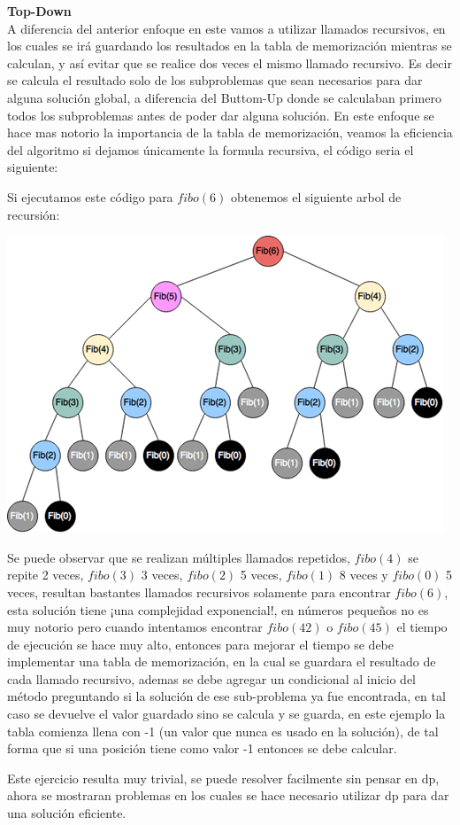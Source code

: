\documentclass[12pt, a4paper]{article}
\newcommand\cppfile[2][]{

}
\begin{document}
	\textbf{Top-Down}\\
	A diferencia del anterior enfoque en este vamos a utilizar llamados recursivos, en los cuales se irá guardando
	los resultados en la tabla de memorización mientras se calculan, y así evitar que se realice dos veces el
	mismo llamado recursivo. Es decir se calcula el resultado solo de los subproblemas que sean necesarios para 
	dar alguna solución global, a diferencia del Buttom-Up donde se calculaban primero todos los
	subproblemas antes de poder dar alguna solución. En este enfoque se hace mas notorio la importancia de la tabla 
	de memorización, veamos la eficiencia del algoritmo si dejamos únicamente la formula recursiva, el código seria 
	el siguiente:
	\cppfile[14-20]{codigos/fibo.cpp}
	Si ejecutamos este código para $fibo(6)$ obtenemos el siguiente arbol de recursión:\\
	\begin{center}
		\includegraphics[scale=0.92]{imagenes/arbol_recursion}
	\end{center}
	
	Se puede observar que se realizan múltiples llamados repetidos, $fibo(4)$ se repite 2 veces, $fibo(3)$
	3 veces, $fibo(2)$ 5 veces, $fibo(1)$ 8 veces y $fibo(0)$ 5 veces, resultan bastantes llamados recursivos
	solamente para encontrar $fibo(6)$, esta solución tiene ¡una complejidad exponencial!, en números pequeños
	no es muy notorio pero cuando intentamos encontrar $fibo(42)$ o $fibo(45)$ el tiempo de ejecución se hace
	muy alto, entonces para mejorar el tiempo se debe implementar una tabla de memorización, en la cual se guardara
	el resultado de cada llamado recursivo, ademas se debe agregar un condicional al inicio del método preguntando
	si la solución de ese sub-problema ya fue encontrada, en tal caso se devuelve el valor guardado sino se calcula
	y se guarda, en este ejemplo la tabla comienza llena con -1 (un valor que nunca es usado en la solución), de 
	tal forma que si una posición tiene como valor -1 entonces se debe calcular.
	\cppfile[22-31]{codigos/fibo.cpp}
	Este ejercicio resulta muy trivial, se puede resolver facilmente sin pensar en dp, ahora se mostraran
	problemas en los cuales se hace necesario utilizar dp para dar una solución eficiente.
	
\end{document}
